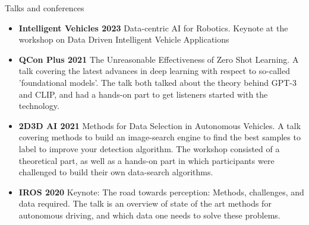 \documentclass[]{mcdowellcv}
\begin{document}
	\begin{cvsection}{Talks and conferences}
		\begin{cvsubsection}{}{}{}	
			\begin{itemize}
				\item \textbf{Intelligent Vehicles 2023}{ Data-centric AI for Robotics. Keynote at the workshop on Data Driven Intelligent Vehicle Applications }
				\item \textbf{QCon Plus 2021}{ The Unreasonable Effectiveness of Zero Shot Learning.  A talk covering the latest advances in deep learning with respect to so-called 'foundational models'.  The talk both talked about the theory behind GPT-3 and CLIP,  and had a hands-on part to get listeners started with the technology. }
				\item \textbf{2D3D AI 2021}{ Methods for Data Selection in Autonomous Vehicles.  A talk covering methods to build an image-search engine to find the best samples to label to improve your detection algorithm. The workshop consisted of a theoretical part, as well as a hands-on part in which participants were challenged to build their own data-search algorithms. }
				\item \textbf{IROS 2020}{ Keynote: The road towards perception: Methods, challenges, and data required.  The talk is an overview of state of the art methods for autonomous driving, and which data one needs to solve these problems. }
			\end{itemize}
		\end{cvsubsection}
	\end{cvsection}

	
\end{document}
